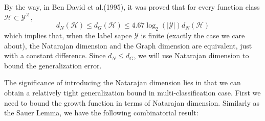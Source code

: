 By the way, in Ben David et al.(1995), it was proved that for every function class $\mathcal{H}\subset \mathcal{Y}^{\mathcal{X}}$,
\begin{equation}
d_N(\mathcal{H}) \leq d_G(\mathcal{H}) \leq 4.67 \log_2(|\mathcal{Y}|)d_N(\mathcal{H})
\end{equation}
which implies that, when the label sapce $\mathcal{Y}$ is finite (exactly the case we care about), the Natarajan dimension and the Graph dimension are equivalent, just with a constant difference. Since $d_N  \leq d_G$, we will use Natarajan dimension to bound the generalization error. 

The significance of introducing the Natarajan dimension lies in that we can obtain a relatively tight generalization bound in multi-classification case. First we need to bound the growth function in terms of Natarajan dimension. Similarly as the Sauer Lemma, we have the following combinatorial result: 


